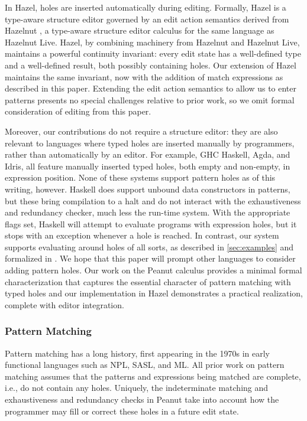 In Hazel, holes are inserted automatically during editing. Formally, Hazel is a type-aware structure editor governed by an edit action semantics derived from Hazelnut \cite{DBLP:conf/popl/OmarVHAH17}, a type-aware structure editor calculus 
for the same language as Hazelnut Live. 
Hazel, by combining machinery from Hazelnut and Hazelnut Live, maintains a powerful continuity invariant: every edit state has a well-defined type
and a well-defined result, both possibly containing holes.
Our extension of Hazel maintains the same invariant, now with the addition of match expressions 
as described in this paper. 
Extending the edit action semantics to allow us to enter patterns presents no special challenges relative to prior work, so we omit formal consideration of editing from this paper.

Moreover, our contributions do not require a structure editor: they are also relevant to languages where typed holes are inserted 
manually by programmers, rather than automatically by an editor. 
For example, GHC Haskell, Agda, and Idris, all feature manually inserted typed holes, both empty and non-empty, in expression position. 
None of these systems support pattern holes as of this writing, however. Haskell does support unbound data constructors in patterns, but these bring compilation to a halt and do not interact with the exhaustiveness and redundancy checker, much less the run-time system. With the appropriate flags set, Haskell will attempt to evaluate programs with expression holes, but it stops with an exception whenever a hole is reached. In contrast, our system supports evaluating around holes of all sorts, as described in \autoref{sec:examples} and formalized in . We hope that this paper will prompt other languages to 
consider adding pattern holes. Our work on the Peanut calculus provides a minimal formal characterization 
that captures the essential character of pattern matching with typed holes and our implementation in Hazel 
demonstrates a practical realization, complete with editor integration.

\subsubsection{Pattern Matching}
Pattern matching has a long history, first appearing in the 1970s in early functional languages
such as NPL, SASL, and ML.
All prior work on pattern matching assumes that the patterns and expressions being matched are
complete, i.e., do not contain any holes.
Uniquely, the indeterminate matching and exhaustiveness and redundancy checks in Peanut
take into account how the programmer may fill or correct these holes in a future edit state.

